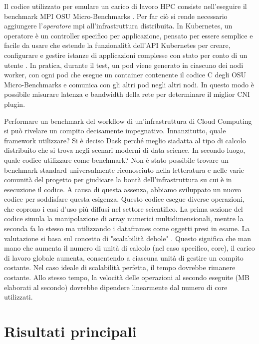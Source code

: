 \noindent Il codice utilizzato per emulare un carico di lavoro HPC consiste
nell'eseguire il benchmark MPI OSU Micro-Benchmarks \cite{osudoc}. Per far ciò
si rende necessario aggiungere l'\textit{operatore} mpi all'infrastruttura
distribuita.
In Kubernetes, un operatore è un controller specifico per applicazione, pensato
per essere semplice e facile da usare che estende la funzionalità dell'API
Kubernetes per creare, configurare e gestire istanze di applicazioni complesse
con stato per conto di un utente \cite{bookofkubernetes}.
In pratica, durante il test, un pod viene generato in ciascuno dei nodi worker,
con ogni pod che esegue un container contenente il codice C degli OSU
Micro-Benchmarks e comunica con gli altri pod negli altri nodi.
In questo modo è possibile misurare latenza e bandwidth della rete per
determinare il miglior CNI plugin.


Performare un benchmark del workflow di un'infrastruttura di Cloud Computing si
può rivelare un compito decisamente impegnativo.
Innanzitutto, quale framework utilizzare? Si è deciso Dask perché meglio
siadatta al tipo di calcolo distribuito che si trova negli scenari moderni di
data science.
In secondo luogo, quale codice utilizzare come benchmark? Non è stato possibile
trovare un benchmark standard universalmente riconosciuto nella letteratura e
nelle varie comunità del progetto per giudicare  la bontà dell'infrastruttura su
cui è in esecuzione il codice.
A causa di questa assenza, abbiamo sviluppato un nuovo codice per soddisfare
questa esigenza.
Questo codice  esegue diverse operazioni, che coprono i casi d'uso più
diffusi nel settore scientifico. La prima sezione del codice simula la
manipolazione di array numerici multidimensionali, mentre la seconda fa lo
stesso ma utilizzando i dataframes come oggetti presi in esame.
La valutazione si basa sul concetto di "scalabilità debole" \cite{Hager2010}.
Questo significa che man mano che aumenta il numero di unità di calcolo (nel
caso specifico, core), il carico di lavoro globale aumenta, consentendo a
ciascuna unità di gestire un compito costante.
Nel caso ideale di scalabilità perfetta, il tempo dovrebbe rimanere costante.
Allo stesso tempo, la velocità delle operazioni al secondo eseguite (MB
elaborati al secondo) dovrebbe dipendere linearmente dal numero di core
utilizzati.

\section*{Risultati principali}

